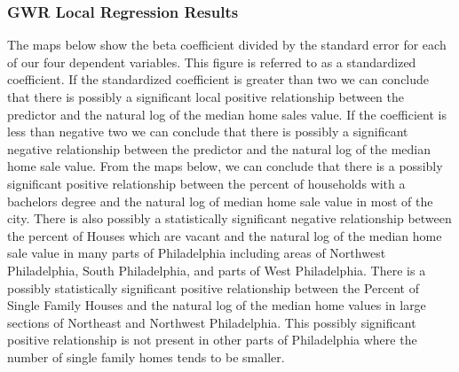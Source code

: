 \documentclass[
]{article}
\begin{document}
\hypertarget{gwr-local-regression-results}{%
\subsubsection{GWR Local Regression
Results}\label{gwr-local-regression-results}}

The maps below show the beta coefficient divided by the standard error
for each of our four dependent variables. This figure is referred to as
a standardized coefficient. If the standardized coefficient is greater
than two we can conclude that there is possibly a significant local
positive relationship between the predictor and the natural log of the
median home sales value. If the coefficient is less than negative two we
can conclude that there is possibly a significant negative relationship
between the predictor and the natural log of the median home sale value.
From the maps below, we can conclude that there is a possibly
significant positive relationship between the percent of households with
a bachelors degree and the natural log of median home sale value in most
of the city. There is also possibly a statistically significant negative
relationship between the percent of Houses which are vacant and the
natural log of the median home sale value in many parts of Philadelphia
including areas of Northwest Philadelphia, South Philadelphia, and parts
of West Philadelphia. There is a possibly statistically significant
positive relationship between the Percent of Single Family Houses and
the natural log of the median home values in large sections of Northeast
and Northwest Philadelphia. This possibly significant positive
relationship is not present in other parts of Philadelphia where the
number of single family homes tends to be smaller.
\end{document}
